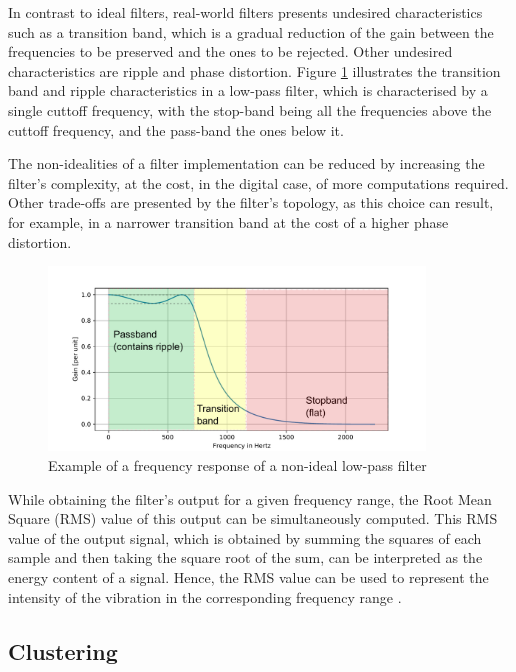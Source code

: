 \documentclass[conference]{IEEEtran}
\begin{document}
In contrast to ideal filters, real-world filters presents undesired characteristics such as a transition band, which is a gradual reduction of the gain between the frequencies to be preserved and the ones to be rejected. Other undesired characteristics are ripple and phase distortion. Figure \ref{fig_filter_nonidealities} illustrates the transition band and ripple characteristics in a low-pass filter, which is characterised by a single cuttoff frequency, with the stop-band being all the frequencies above the cuttoff frequency, and the pass-band the ones below it.

The non-idealities of a filter implementation can be reduced by increasing the filter's complexity, at the cost, in the digital case, of more computations required. Other trade-offs are presented by the filter's topology, as this choice can result, for example, in a narrower transition band at the cost of a higher phase distortion.



\begin{figure}[htbp]
\centerline{\includegraphics[width=10cm]{graphics/filter_bands/filter_bands_good.pdf}}
\caption{Example of a frequency response of a non-ideal low-pass filter}
\label{fig_filter_nonidealities}
\end{figure}


While obtaining the filter's output for a given frequency range, the Root Mean Square (RMS) value of this output can be simultaneously computed. This RMS value of the output signal, which is obtained by summing the squares of each sample and then taking the square root of the sum, can be interpreted as the energy content of a signal. Hence, the RMS value can be used to represent the intensity of the vibration in the corresponding frequency range \cite{b3}.


\subsection{Clustering}
\label{sec_clustering}
\end{document}
